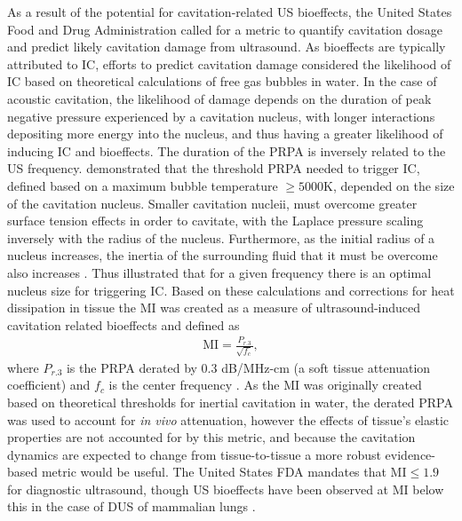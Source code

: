 As a result of the potential for cavitation-related \ac{US}
bioeffects, the United States Food and Drug Administration called for
a metric to quantify cavitation dosage and predict likely cavitation
damage from ultrasound. As bioeffects are typically attributed to
\ac{IC}, efforts to predict cavitation damage considered the
likelihood of \ac{IC} based on theoretical calculations of free gas
bubbles in water. In the case of acoustic cavitation, the likelihood
of damage depends on the duration of peak negative pressure
experienced by a cavitation nucleus, with longer interactions
depositing more energy into the nucleus, and thus having a greater
likelihood of inducing \ac{IC} and bioeffects. The duration of the
\ac{PRPA} is inversely related to the \ac{US}
frequency. \cite{Holland1989} demonstrated that the threshold
\ac{PRPA} needed to trigger \ac{IC}, defined based on a maximum bubble
temperature $\geq5000$K, depended on the size of the cavitation
nucleus. Smaller cavitation nucleii, must overcome greater surface
tension effects in order to cavitate, with the Laplace pressure
scaling inversely with the radius of the nucleus. Furthermore, as the
initial radius of a nucleus increases, the inertia of the surrounding
fluid that it must be overcome also increases \citep{AiumS72000}. Thus
\cite{Holland1989} illustrated that for a given frequency there is an
optimal nucleus size for triggering \ac{IC}. Based on these
calculations and corrections for heat dissipation in tissue the
\ac{MI} was created as a measure of ultrasound-induced cavitation
related bioeffects and defined as
\begin{align}
  \text{MI} = \frac{P_{r.3}}{\sqrt{f_c}},
\end{align}
where $P_{r.3}$ is the \ac{PRPA} derated by $0.3$ dB/MHz-cm (a soft
tissue attenuation coefficient) and $f_c$ is the center frequency
\cite{Apfel1991}. As the \ac{MI} was originally created based on
theoretical thresholds for inertial cavitation in water, the derated
\ac{PRPA} was used to account for \emph{in vivo} attenuation, however
the effects of tissue's elastic properties are not accounted for by
this metric, and because the cavitation dynamics are expected to
change from tissue-to-tissue a more robust evidence-based metric would
be useful. The United States \ac{FDA} mandates that MI$\leq1.9$ for
diagnostic ultrasound, though \ac{US} bioeffects have been observed at
\ac{MI} below this in the case of \ac{DUS} of mammalian lungs
\citep{OBrien2007,FDA1997}.

